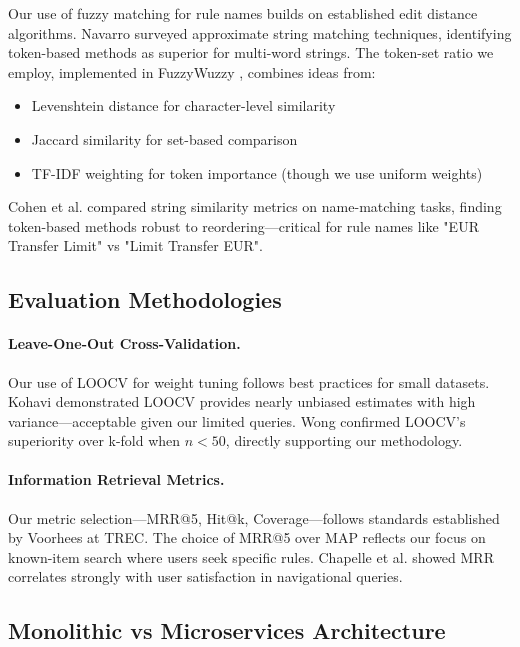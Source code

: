 Our use of fuzzy matching for rule names builds on established edit distance algorithms. Navarro \cite{navarro2001guided} surveyed approximate string matching techniques, identifying token-based methods as superior for multi-word strings. The token-set ratio we employ, implemented in FuzzyWuzzy \cite{fuzzywuzzy2011}, combines ideas from:
\begin{itemize}[leftmargin=*,itemsep=2pt,topsep=2pt]
 \item Levenshtein distance \cite{levenshtein1966} for character-level similarity
 \item Jaccard similarity for set-based comparison
 \item TF-IDF weighting for token importance (though we use uniform weights)
\end{itemize}

Cohen et al. \cite{cohen2003comparison} compared string similarity metrics on name-matching tasks, finding token-based methods robust to reordering—critical for rule names like "EUR Transfer Limit" vs "Limit Transfer EUR".

\subsection{Evaluation Methodologies}

\paragraph{Leave-One-Out Cross-Validation.} Our use of LOOCV for weight tuning follows best practices for small datasets. Kohavi \cite{kohavi1995study} demonstrated LOOCV provides nearly unbiased estimates with high variance—acceptable given our limited queries. Wong \cite{wong2015performance} confirmed LOOCV's superiority over k-fold when $n < 50$, directly supporting our methodology.

\paragraph{Information Retrieval Metrics.} Our metric selection—MRR@5, Hit@k, Coverage—follows standards established by Voorhees \cite{voorhees1999trec} at TREC. The choice of MRR@5 over MAP reflects our focus on known-item search where users seek specific rules. Chapelle et al. \cite{chapelle2009expected} showed MRR correlates strongly with user satisfaction in navigational queries.

\subsection{Monolithic vs Microservices Architecture}

